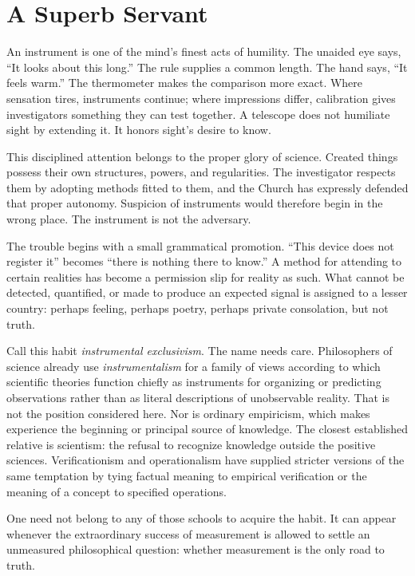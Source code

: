 \section{A Superb Servant}

An instrument is one of the mind's finest acts of humility. The unaided eye says, ``It looks about this long.'' The rule supplies a common length. The hand says, ``It feels warm.'' The thermometer makes the comparison more exact. Where sensation tires, instruments continue; where impressions differ, calibration gives investigators something they can test together. A telescope does not humiliate sight by extending it. It honors sight's desire to know.

This disciplined attention belongs to the proper glory of science. Created things possess their own structures, powers, and regularities. The investigator respects them by adopting methods fitted to them, and the Church has expressly defended that proper autonomy. Suspicion of instruments would therefore begin in the wrong place. The instrument is not the adversary.

The trouble begins with a small grammatical promotion. ``This device does not register it'' becomes ``there is nothing there to know.'' A method for attending to certain realities has become a permission slip for reality as such. What cannot be detected, quantified, or made to produce an expected signal is assigned to a lesser country: perhaps feeling, perhaps poetry, perhaps private consolation, but not truth.

Call this habit \emph{instrumental exclusivism}. The name needs care. Philosophers of science already use \emph{instrumentalism} for a family of views according to which scientific theories function chiefly as instruments for organizing or predicting observations rather than as literal descriptions of unobservable reality. That is not the position considered here. Nor is ordinary empiricism, which makes experience the beginning or principal source of knowledge. The closest established relative is scientism: the refusal to recognize knowledge outside the positive sciences. Verificationism and operationalism have supplied stricter versions of the same temptation by tying factual meaning to empirical verification or the meaning of a concept to specified operations.

One need not belong to any of those schools to acquire the habit. It can appear whenever the extraordinary success of measurement is allowed to settle an unmeasured philosophical question: whether measurement is the only road to truth.
